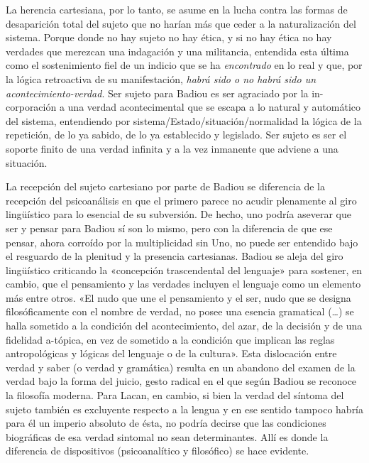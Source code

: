 La herencia cartesiana, por lo tanto, se asume en la lucha contra las formas de desaparición total del sujeto que no harían más que ceder a la naturalización del sistema. Porque donde no hay sujeto no hay ética, y si no hay ética no hay verdades que merezcan una indagación y una militancia, entendida esta última como el sostenimiento fiel de un indicio que se ha \emph{encontrado} en lo real y que, por la lógica retroactiva de su manifestación, \emph{habrá sido o no habrá sido un acontecimiento-verdad}. Ser sujeto para Badiou es ser agraciado por la in-corporación a una verdad acontecimental que se escapa a lo natural y automático del sistema, entendiendo por sistema/Estado/situación/normalidad la lógica de la repetición, de lo ya sabido, de lo ya establecido y legislado. Ser sujeto es ser el soporte finito de una verdad infinita y a la vez inmanente que adviene a una situación.

La recepción del sujeto cartesiano por parte de Badiou se diferencia de la recepción del psicoanálisis en que el primero parece no acudir plenamente al giro lingüístico para lo esencial de su subversión. De hecho, uno podría aseverar que ser y pensar para Badiou sí son lo mismo, pero con la diferencia de que ese pensar, ahora corroído por la multiplicidad sin Uno, no puede ser entendido bajo el resguardo de la plenitud y la presencia cartesianas. Badiou se aleja del giro lingüístico criticando la «concepción trascendental del lenguaje» para sostener, en cambio, que el pensamiento y las verdades incluyen el lenguaje como un elemento más entre otros. «El nudo que une el pensamiento y el ser, nudo que se designa filosóficamente con el nombre de verdad, no posee una esencia gramatical (\ldots) se halla sometido a la condición del acontecimiento, del azar, de la decisión y de una fidelidad a-tópica, en vez de sometido a la condición que implican las reglas antropológicas y lógicas del lenguaje o de la cultura». Esta dislocación entre verdad y saber (o verdad y gramática) resulta en un abandono del examen de la verdad bajo la forma del juicio, gesto radical en el que según Badiou se reconoce la filosofía moderna. Para Lacan, en cambio, si bien la verdad del síntoma del sujeto también es excluyente respecto a la lengua y en ese sentido tampoco habría para él un imperio absoluto de ésta, no podría decirse que las condiciones biográficas de esa verdad sintomal no sean determinantes. Allí es donde la diferencia de dispositivos (psicoanalítico y filosófico) se hace evidente.

